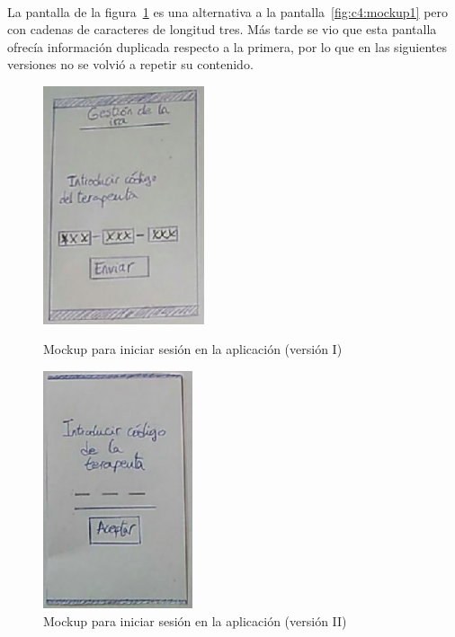 \paragraph{}
La pantalla de la figura~\ref{fig:c4:mockup2} es una alternativa a la pantalla~\ref{fig:c4:mockup1} pero con cadenas de caracteres de longitud tres. Más tarde se vio que esta pantalla ofrecía información duplicada respecto a la primera, por lo que en las siguientes versiones no se volvió a repetir su contenido.

\begin{figure}[h]
    \centering
    \begin{minipage}{.45\textwidth}
        \centering
        \includegraphics[width=0.8\linewidth, height=7cm]{Imagenes/anxA1-1.png}
        \caption[Mockup para iniciar sesión en la aplicación (versión I)]{Mockup para iniciar sesión en la aplicación (versión I)}
        \label{fig:c4:mockup1}
    \end{minipage}
    \hfill\vline\hfill
    \begin{minipage}{.45\textwidth}
        \centering
        \includegraphics[width=0.8\linewidth, height=7cm]{Imagenes/anxA1-5.png}
        \caption[Mockup para iniciar sesión en la aplicación (versión II)]{Mockup para iniciar sesión en la aplicación (versión II)}
        \label{fig:c4:mockup2}
    \end{minipage}
\end{figure}


